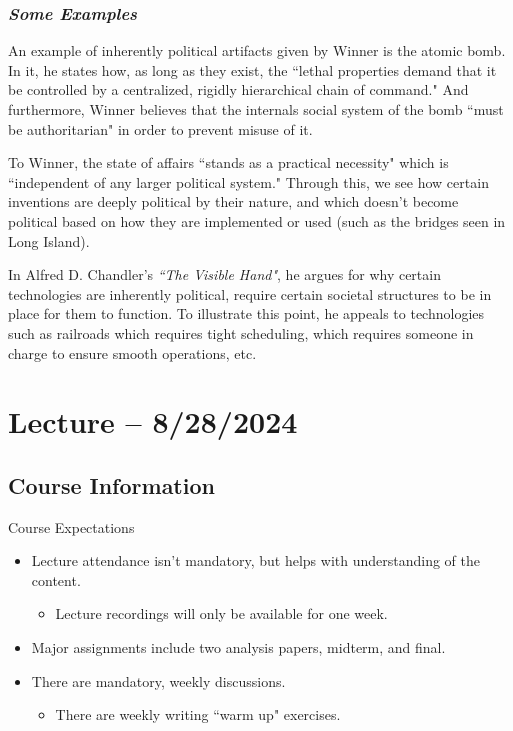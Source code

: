 \documentclass[openany]{book}
\begin{document}
\subsubsection{\textit{Some Examples}}
\begin{example}
	An example of inherently political artifacts given by Winner is the atomic bomb. In it, he states how, as long as they exist, the ``lethal properties demand that it be controlled by a centralized, rigidly hierarchical chain of command." And furthermore, Winner believes that the internals social system of the bomb ``must be authoritarian" in order to prevent misuse of it.
	
	To Winner, the state of affairs ``stands as a practical necessity" which is ``independent of any larger political system." Through this, we see how certain inventions are deeply political by their nature, and which doesn't become political based on how they are implemented or used (such as the bridges seen in Long Island).
\end{example}

\begin{example}
	In Alfred D. Chandler's \textit{``The Visible Hand"}, he argues for why certain technologies are inherently political, require certain societal structures to be in place for them to function. To illustrate this point, he appeals to technologies such as railroads which requires tight scheduling, which requires someone in charge to ensure smooth operations, etc.
\end{example}

\section{Lecture -- 8/28/2024}
\subsection{Course Information}
\begin{miscbox}{Course Expectations}
\begin{itemize}
	\item Lecture attendance isn't mandatory, but helps with understanding of the content.
	\begin{itemize}
		\item Lecture recordings will only be available for one week.
	\end{itemize}
	\item Major assignments include two analysis papers, midterm, and final.
	\item There are mandatory, weekly discussions.
	\begin{itemize}
		\item There are weekly writing ``warm up" exercises.
	\end{itemize}
\end{itemize}
\end{miscbox}
\end{document}
